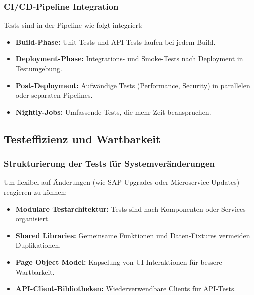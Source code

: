 \subsubsection{CI/CD-Pipeline Integration}
Tests sind in der Pipeline wie folgt integriert:

\begin{itemize}
    \item \textbf{Build-Phase:} Unit-Tests und API-Tests laufen bei jedem Build.
    \item \textbf{Deployment-Phase:} Integrations- und Smoke-Tests nach Deployment in Testumgebung.
    \item \textbf{Post-Deployment:} Aufwändige Tests (Performance, Security) in parallelen oder
    separaten Pipelines.
    \item \textbf{Nightly-Jobs:} Umfassende Tests, die mehr Zeit beanspruchen.
\end{itemize}

\subsection{Testeffizienz und Wartbarkeit}
\subsubsection{Strukturierung der Tests für Systemveränderungen}
Um flexibel auf Änderungen (wie SAP-Upgrades oder Microservice-Updates) reagieren zu können:

\begin{itemize}
    \item \textbf{Modulare Testarchitektur:} Tests sind nach Komponenten oder Services organisiert.
    \item \textbf{Shared Libraries:} Gemeinsame Funktionen und Daten-Fixtures vermeiden Duplikationen.
    \item \textbf{Page Object Model:} Kapselung von UI-Interaktionen für bessere Wartbarkeit.
    \item \textbf{API-Client-Bibliotheken:} Wiederverwendbare Clients für API-Tests.
\end{itemize}

